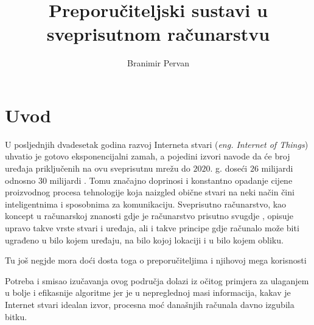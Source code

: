 \documentclass[times, utf8, diplomski, numeric]{fer}
\begin{document}

\title{Preporučiteljski sustavi u sveprisutnom računarstvu}

\author{Branimir Pervan}

\maketitle

\izvornik


\tableofcontents


\chapter{Uvod}
U posljednjih dvadesetak godina razvoj Interneta stvari (\emph{eng. Internet
of Things}) uhvatio je gotovo eksponencijalni zamah, a pojedini izvori navode da
će broj uređaja priključenih na ovu sveprisutnu mrežu do $2020$. g. doseći $26$
milijardi \cite{gartner2013Iot} odnosno $30$ milijardi \cite{ABI2013Iot}. Tomu
značajno doprinosi i konstantno opadanje cijene proizvodnog procesa tehnologije
koja naizgled obične stvari na neki način čini inteligentnima i sposobnima za
komunikaciju. Sveprisutno računarstvo, kao koncept u računarskoj znanosti
gdje je računarstvo prisutno svugdje \cite{theComputerWeiser}, opisuje upravo 
takve vrste stvari i uređaja, ali i takve principe gdje računalo može biti
ugrađeno u bilo kojem uređaju, na bilo kojoj lokaciji i u bilo kojem obliku.

Tu još negjde mora doći dosta toga o preporučiteljima i njihovoj mega
korisnosti 

Potreba i smisao izučavanja ovog područja dolazi iz očitog primjera za
ulaganjem u bolje i efikasnije algoritme jer je u nepreglednoj masi
informacija, kakav je Internet stvari idealan izvor, procesna moć današnjih
računala davno izgubila bitku.
\end{document}

